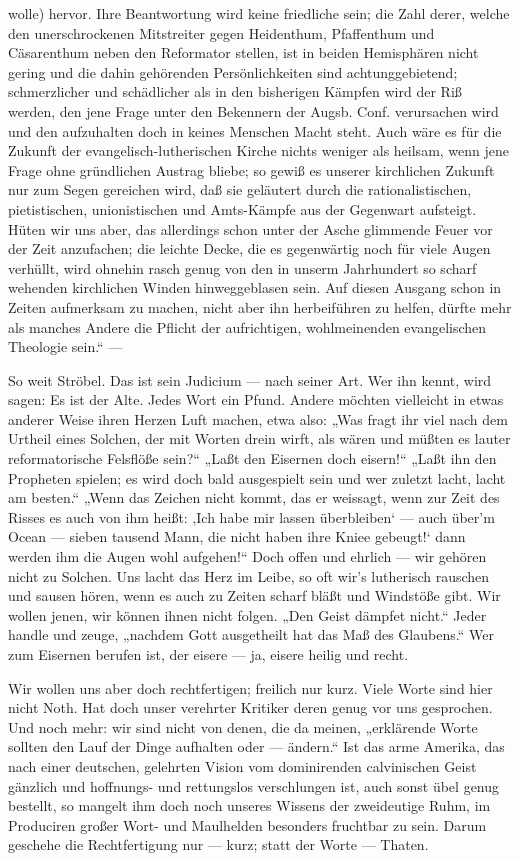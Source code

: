 wolle) hervor. Ihre Beantwortung wird keine friedliche sein; die Zahl derer, welche den unerschrockenen
Mitstreiter gegen Heidenthum, Pfaffenthum und Cäsarenthum neben den Reformator stellen, ist in beiden
Hemisphären nicht gering und die dahin gehörenden Persönlichkeiten sind achtunggebietend; schmerzlicher
und schädlicher als in den bisherigen Kämpfen wird der Riß werden, den jene Frage unter den Bekennern
der Augsb. Conf. verursachen wird und den aufzuhalten doch in keines Menschen Macht steht. Auch wäre
es für die Zukunft der evangelisch-lutherischen Kirche nichts weniger als heilsam, wenn jene Frage ohne
gründlichen Austrag bliebe; so gewiß es unserer kirchlichen Zukunft nur zum Segen gereichen wird, daß
sie geläutert durch die rationalistischen, pietistischen, unionistischen und Amts-Kämpfe aus der Gegenwart
aufsteigt. Hüten wir uns aber, das allerdings schon unter der Asche glimmende Feuer vor
der Zeit anzufachen; die leichte Decke, die es gegenwärtig noch für viele Augen verhüllt, wird ohnehin
rasch genug von den in unserm Jahrhundert so scharf wehenden kirchlichen Winden hinweggeblasen sein. Auf
diesen Ausgang schon in Zeiten aufmerksam zu machen, nicht aber ihn herbeiführen zu helfen, dürfte
mehr als manches Andere die Pflicht der aufrichtigen, wohlmeinenden evangelischen Theologie sein.“ —

So weit Ströbel. Das ist sein Judicium — nach seiner Art. Wer ihn kennt, wird sagen: Es ist der
Alte. Jedes Wort ein Pfund. Andere möchten vielleicht in etwas anderer Weise ihren Herzen Luft machen,
etwa also: „Was fragt ihr viel nach dem Urtheil eines Solchen, der mit Worten drein wirft, als wären
und müßten es lauter reformatorische Felsflöße sein?“ „Laßt den Eisernen doch eisern!“ „Laßt
ihn den Propheten spielen; es wird doch bald ausgespielt sein und wer zuletzt lacht, lacht am besten.“
„Wenn das Zeichen nicht kommt, das er weissagt, wenn zur Zeit des Risses es auch von ihm heißt: ‚Ich
habe mir lassen überbleiben‘ — auch über’m Ocean — sieben tausend Mann, die nicht haben ihre
Kniee gebeugt!‘ dann werden ihm die Augen wohl aufgehen!“ Doch offen und ehrlich — wir gehören
nicht zu Solchen. Uns lacht das Herz im Leibe, so oft wir’s lutherisch rauschen und sausen hören,
wenn es auch zu Zeiten scharf bläßt und Windstöße gibt. Wir wollen jenen, wir können ihnen nicht
folgen. „Den Geist dämpfet nicht.“ Jeder handle und zeuge, „nachdem Gott ausgetheilt hat das Maß
des Glaubens.“ Wer zum Eisernen berufen ist, der eisere — ja, eisere heilig und recht.

Wir wollen uns aber doch rechtfertigen; freilich nur kurz. Viele Worte sind hier nicht Noth. Hat doch
unser verehrter Kritiker deren genug vor uns gesprochen. Und noch mehr: wir sind nicht von denen, die
da meinen, „erklärende Worte sollten den Lauf der Dinge aufhalten oder — ändern.“ Ist das arme
Amerika, das nach einer deutschen, gelehrten Vision vom dominirenden calvinischen Geist gänzlich und
hoffnungs- und rettungslos verschlungen ist, auch sonst übel genug bestellt, so mangelt ihm doch noch
unseres Wissens der zweideutige Ruhm, im Produciren großer Wort- und Maulhelden besonders fruchtbar zu
sein. Darum geschehe die Rechtfertigung nur — kurz; statt der Worte — Thaten.

